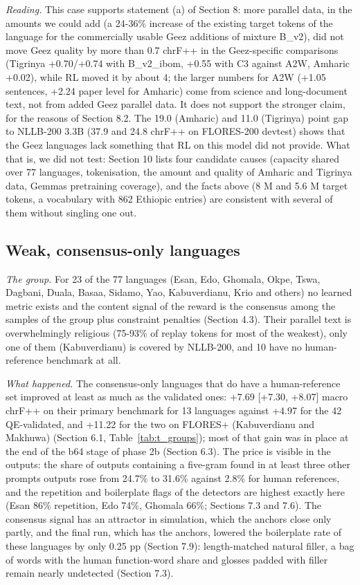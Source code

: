 \emph{Reading.} This case supports statement (a) of Section 8: more parallel data, in the amounts we could add (a 24-36\% increase of the existing target tokens of the language for the commercially usable Ge\textquotesingle ez additions of mixture B\_v2), did not move Ge\textquotesingle ez quality by more than 0.7 chrF++ in the Ge\textquotesingle ez-specific comparisons (Tigrinya +0.70/+0.74 with B\_v2\_ibom, +0.55 with C3 against A2W, Amharic +0.02), while RL moved it by about 4; the larger numbers for A2W (+1.05 sentences, +2.24 paper level for Amharic) come from science and long-document text, not from added Ge\textquotesingle ez parallel data. It does not support the stronger claim, for the reasons of Section 8.2. The 19.0 (Amharic) and 11.0 (Tigrinya) point gap to NLLB-200 3.3B (37.9 and 24.8 chrF++ on FLORES-200 devtest) shows that the Ge\textquotesingle ez languages lack something that RL on this model did not provide. What that is, we did not test: Section 10 lists four candidate causes (capacity shared over 77 languages, tokenisation, the amount and quality of Amharic and Tigrinya data, Gemma\textquotesingle s pretraining coverage), and the facts above (8 M and 5.6 M target tokens, a vocabulary with 862 Ethiopic entries) are consistent with several of them without singling one out.

\subsection{Weak, consensus-only languages}\label{weak-consensus-only-languages}

\emph{The group.} For 23 of the 77 languages (Esan, Edo, Ghomala, Okpe, Tswa, Dagbani, Duala, Basaa, Sidamo, Yao, Kabuverdianu, Krio and others) no learned metric exists and the content signal of the reward is the consensus among the samples of the group plus constraint penalties (Section 4.3). Their parallel text is overwhelmingly religious (75-93\% of replay tokens for most of the weakest), only one of them (Kabuverdianu) is covered by NLLB-200, and 10 have no human-reference benchmark at all.

\emph{What happened.} The consensus-only languages that do have a human-reference set improved at least as much as the validated ones: +7.69 {[}+7.30, +8.07{]} macro chrF++ on their primary benchmark for 13 languages against +4.97 for the 42 QE-validated, and +11.22 for the two on FLORES+ (Kabuverdianu and Makhuwa) (Section 6.1, Table~\ref{tab:t_groups}); most of that gain was in place at the end of the b64 stage of phase 2b (Section 6.3). The price is visible in the outputs: the share of outputs containing a five-gram found in at least three other prompts\textquotesingle{} outputs rose from 24.7\% to 31.6\% against 2.8\% for human references, and the repetition and boilerplate flags of the detectors are highest exactly here (Esan 86\% repetition, Edo 74\%, Ghomala 66\%; Sections 7.3 and 7.6). The consensus signal has an attractor in simulation, which the anchors close only partly, and the final run, which has the anchors, lowered the boilerplate rate of these languages by only 0.25 pp (Section 7.9): length-matched natural filler, a bag of words with the human function-word share and glosses padded with filler remain nearly undetected (Section 7.3).


